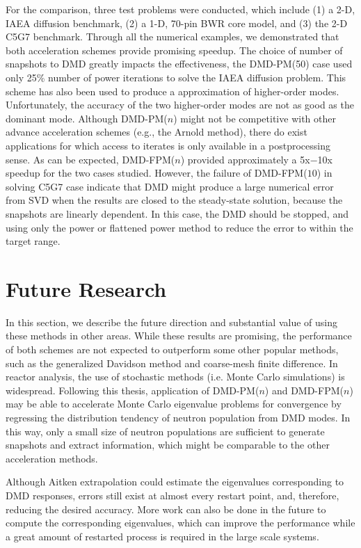 For the comparison, three test problems were conducted, which include (1) a 2-D, IAEA diffusion benchmark, (2) a 1-D, 70-pin BWR core model, and (3) the 2-D C5G7 benchmark.
Through all the numerical examples, we demonstrated that both acceleration schemes provide promising speedup. 
The choice of number of snapshots to DMD greatly impacts the effectiveness, the DMD-PM(50) case used only 25\% number of power iterations to solve the IAEA diffusion problem.
This scheme has also been used to produce a approximation of higher-order modes.
Unfortunately, the accuracy of the two higher-order modes are not as good as the dominant mode.
Although DMD-PM($n$) might not be competitive with other advance acceleration schemes (e.g., the Arnold method), there do exist applications for which access to iterates is only available in a postprocessing sense.
As can be expected, DMD-FPM($n$) provided approximately a 5x$-$10x speedup for the two cases studied.
However, the failure of DMD-FPM($10$) in solving C5G7 case indicate that DMD might produce a large numerical error from SVD when the results are closed to the steady-state solution, because the snapshots are linearly dependent.
In this case, the DMD should be stopped, and using only the power or flattened power method to reduce the error to within the target range.

\section{Future Research}

In this section, we describe the future direction and substantial value of using these methods in other areas.
While these results are promising, the performance of both schemes are not expected to outperform some other popular methods, such as the generalized Davidson method\cite{hamilton2011numerical} and coarse-mesh finite difference\cite{smith_1983}.
In reactor analysis, the use of stochastic methods (i.e. Monte Carlo simulations) is widespread.
Following this thesis, application of DMD-PM($n$) and DMD-FPM($n$) may be able to accelerate Monte Carlo eigenvalue problems for convergence by regressing the distribution tendency of neutron population from DMD modes.
In this way, only a small size of neutron populations are sufficient to generate snapshots and extract information, which might be comparable to the other acceleration methods.

Although Aitken extrapolation could estimate the eigenvalues corresponding to DMD responses, errors still exist at almost every restart point, and, therefore, reducing the desired accuracy. 
More work can also be done in the future to compute the corresponding eigenvalues, which can improve the performance while a great amount of restarted process is required in the large scale systems.
